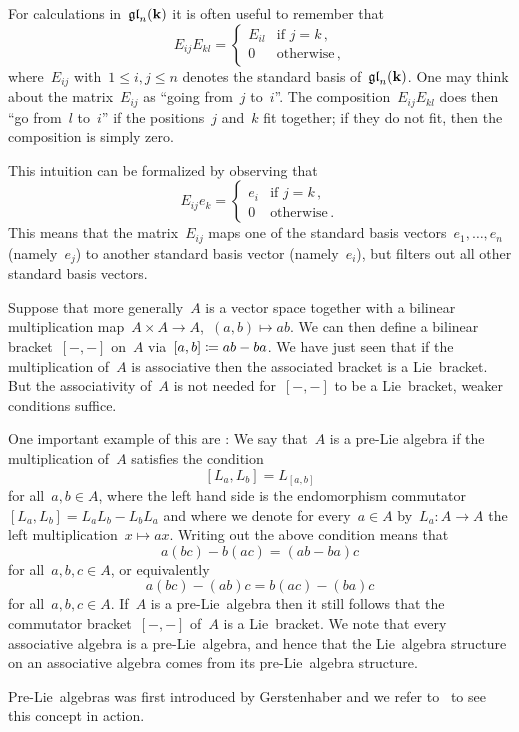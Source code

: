 \begin{recall}
  For calculations in~$\mathfrak{gl}_n(\mathbf{k})$ it is often useful to remember that
  \[
    E_{ij} E_{kl}
    =
    \begin{cases}
      E_{il}  & \text{if~$j = k$} \,, \\
      0       & \text{otherwise}  \,,
    \end{cases}
  \]
  where~$E_{ij}$ with~$1 \leq i,j \leq n$ denotes the standard basis of~$\mathfrak{gl}_n(\mathbf{k})$.
  One may think about the matrix~$E_{ij}$ as \enquote{going from~$j$ to~$i$}.
  The composition~$E_{ij} E_{kl}$ does then \enquote{go from~$l$ to~$i$} if the positions~$j$ and~$k$ fit together;
  if they do not fit, then the composition is simply zero.
  
  This intuition can be formalized by observing that
  \[
    E_{ij} e_k
    =
    \begin{cases}
      e_i & \text{if~$j = k$} \,, \\
      0   & \text{otherwise}  \,.
    \end{cases}
  \]
  This means that the matrix~$E_{ij}$ maps one of the standard basis vectors~$e_1, \dotsc, e_n$ (namely~$e_j$) to another standard basis vector (namely~$e_i$), but filters out all other standard basis vectors.
\end{recall}


\begin{remark}
  Suppose that more generally~$A$ is a vector space together with a bilinear multiplication map~$A \times A \to A$,~$(a,b) \mapsto ab$.
  We can then define a bilinear bracket~$[-,-]$ on~$A$ via~$[a,b] \coloneqq ab-ba$.
  We have just seen that if the multiplication of~$A$ is associative then the associated bracket is a Lie~bracket.
  But the associativity of~$A$ is not needed for~$[-,-]$ to be a Lie~bracket, weaker conditions suffice.
  
  One important example of this are :
  We say that~$A$ is a pre-Lie algebra if the multiplication of~$A$ satisfies the condition
  \[
    [L_a, L_b]
    =
    L_{[a,b]}
  \]
  for all~$a, b \in A$, where the left hand side is the endomorphism commutator~$[L_a, L_b] = L_a L_b - L_b L_a$ and where we denote for every~$a \in A$ by~$L_a \colon A \to A$ the left multiplication~$x \mapsto ax$.
  Writing out the above condition means that
  \[
    a(bc) - b(ac)
    =
    (ab-ba)c
  \]
  for all~$a, b, c \in A$, or equivalently
  \[
    a(bc) - (ab)c
    =
    b(ac) - (ba)c
  \]
  for all~$a, b, c \in A$.
  If~$A$ is a pre-Lie~algebra then it still follows that the commutator bracket~$[-,-]$ of~$A$ is a Lie~bracket.
  We note that every associative algebra is a pre-Lie~algebra, and hence that the Lie~algebra structure on an associative algebra comes from its pre-Lie~algebra structure.
  
 Pre-Lie~algebras was first introduced by Gerstenhaber and we refer to~\cite{gerstenhaber} to see this concept in action.
\end{remark}


